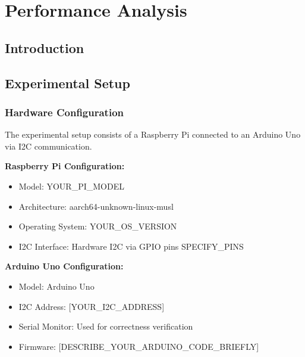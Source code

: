 \chapter{Performance Analysis}
\label{chap:performance-analysis}

\section{Introduction}
\label{sec:perf-intro}


\section{Experimental Setup}
\label{sec:experimental-setup}

\subsection{Hardware Configuration}
\label{subsec:hardware-config}


The experimental setup consists of a Raspberry Pi connected to an Arduino Uno via I2C communication.

\textbf{Raspberry Pi Configuration:}
\begin{itemize}
    \item Model: YOUR\_PI\_MODEL
    \item Architecture: aarch64-unknown-linux-musl
    \item Operating System: YOUR\_OS\_VERSION
    \item I2C Interface: Hardware I2C via GPIO pins SPECIFY\_PINS
\end{itemize}

\textbf{Arduino Uno Configuration:}
\begin{itemize}
    \item Model: Arduino Uno
    \item I2C Address: [YOUR\_I2C\_ADDRESS] 
    \item Serial Monitor: Used for correctness verification
    \item Firmware: [DESCRIBE\_YOUR\_ARDUINO\_CODE\_BRIEFLY]
\end{itemize}

